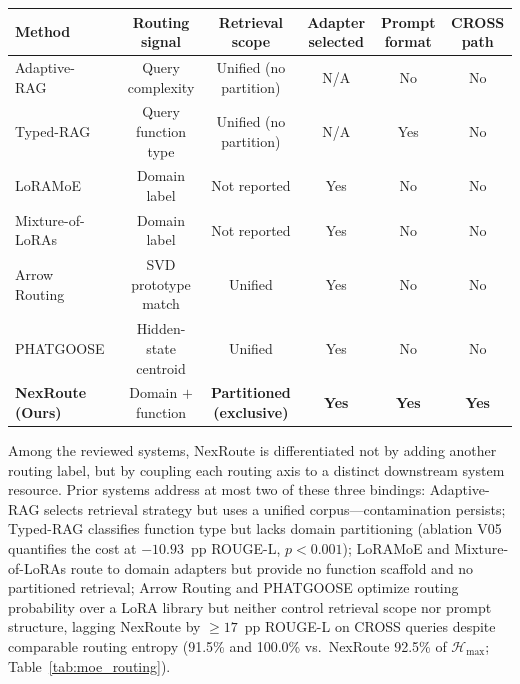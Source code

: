 \documentclass[a4paper,fleql,doubleblind]{cas-sc}
\begin{document}
\vspace{4pt}
\begin{center}
\begingroup
\renewcommand{\arraystretch}{1.25}
\label{tab:design_space}
\small
\begin{tabular}{l c c c c c}
\toprule
\textbf{Method} & \textbf{Routing signal} & \textbf{Retrieval scope} & \textbf{Adapter selected} & \textbf{Prompt format} & \textbf{CROSS path} \\
\midrule
Adaptive-RAG~\citep{jeong2024adaptiverag} & Query complexity & Unified (no partition) & N/A & No & No \\
Typed-RAG~\citep{typedrag}               & Query function type & Unified (no partition) & N/A & Yes & No \\
LoRAMoE~\citep{dou2024loramoe}           & Domain label & Not reported & Yes & No & No \\
Mixture-of-LoRAs~\citep{wu2024mixtureofloras} & Domain label & Not reported & Yes & No & No \\
Arrow Routing~\citep{arrow2024routing}   & SVD prototype match & Unified & Yes & No & No \\
PHATGOOSE~\citep{muqeeth2024phatgoose}   & Hidden-state centroid & Unified & Yes & No & No \\
\midrule
\textbf{NexRoute (Ours)} & Domain $+$ function & \textbf{Partitioned (exclusive)} & \textbf{Yes} & \textbf{Yes} & \textbf{Yes} \\
\bottomrule
\end{tabular}
\endgroup
\end{center}
\vspace{4pt}

\noindent
Among the reviewed systems, NexRoute is differentiated not by adding another routing label,
but by coupling each routing axis to a distinct downstream system resource.
Prior systems address at most two of these three bindings:
Adaptive-RAG selects retrieval strategy but uses a unified corpus---contamination persists;
Typed-RAG classifies function type but lacks domain partitioning (ablation V05 quantifies the cost at $-10.93$~pp ROUGE-L, $p{<}0.001$);
LoRAMoE and Mixture-of-LoRAs route to domain adapters but provide no function scaffold and no partitioned retrieval;
Arrow Routing and PHATGOOSE optimize routing probability over a LoRA library but neither control retrieval scope nor prompt structure, lagging NexRoute by ${\geq}17$~pp ROUGE-L on CROSS queries despite comparable routing entropy
(91.5\% and 100.0\% vs.\ NexRoute 92.5\% of $\mathcal{H}_{\max}$; Table~\ref{tab:moe_routing}).
\end{document}
